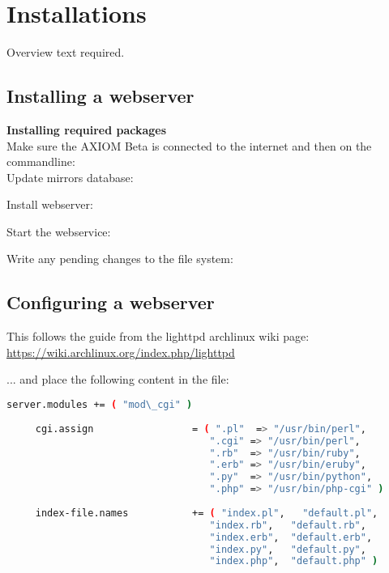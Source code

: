 \section{Installations}

Overview text required.





\subsection{Installing a webserver}

\textbf{Installing required packages}\\

Make sure the AXIOM Beta is connected to the internet and then on the commandline:\\

Update mirrors database: 


Install webserver: 


Start the webservice: 


Write any pending changes to the file system:






\subsection{Configuring a webserver}

This follows the guide from the lighttpd archlinux wiki page: \href{https://wiki.archlinux.org/index.php/lighttpd}{https://wiki.archlinux.org/index.php/lighttpd}

    
... and place the following content in the file: 

\begin{lstlisting}[language=bash,morekeywords=$,keywordstyle=\bfseries,frame=none,xleftmargin=.25in,belowskip=2em, aboveskip=2em]
    server.modules += ( "mod\_cgi" )
     
     cgi.assign                 = ( ".pl"  => "/usr/bin/perl",
                                   ".cgi" => "/usr/bin/perl",
                                   ".rb"  => "/usr/bin/ruby",
                                   ".erb" => "/usr/bin/eruby",
                                   ".py"  => "/usr/bin/python",
                                   ".php" => "/usr/bin/php-cgi" )
     
     index-file.names           += ( "index.pl",   "default.pl",
                                   "index.rb",   "default.rb",
                                   "index.erb",  "default.erb",
                                   "index.py",   "default.py",
                                   "index.php",  "default.php" )
\end{lstlisting}    

